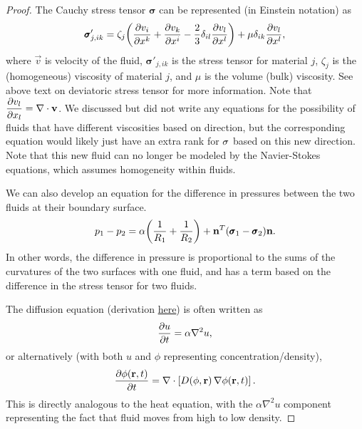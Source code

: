 \documentclass[12 pt]{article}
\theoremstyle{definition}
\begin{document}
\begin{proof}
The Cauchy stress tensor $\pmb{\sigma}$ can be represented (in Einstein notation) as
\[\pmb{\sigma}'_{j,ik} = \zeta_j\pqty{\pdv{v_i}{x^k}+\pdv{v_k}{x^i}-\frac{2}{3}\delta_{il}\pdv{v_l}{x^l}} + \mu\delta_{ik}\pdv{v_l}{x^l},\]
where $\vec{v}$ is velocity of the fluid, $\pmb{\sigma}'_{j,ik}$ is the stress tensor for material $j$, $\zeta_j$ is the (homogeneous) viscosity of material $j$, and $\mu$ is the volume (bulk) viscosity. See above text on deviatoric stress tensor for more information. Note that $\displaystyle\pdv{v_l}{x_l} = \nabla\cdot\vb{v}$. We discussed but did not write any equations for the possibility of fluids that have different viscosities based on direction, but the corresponding equation would likely just have an extra rank for $\vb{\sigma}$ based on this new direction. Note that this new fluid can no longer be modeled by the Navier-Stokes equations, which assumes homogeneity within fluids.

We can also develop an equation for the difference in pressures between the two fluids at their boundary surface.
\[p_1-p_2 = \alpha\pqty{\frac{1}{R_1} + \frac{1}{R_2}} + \vb{n}^T\pqty{\pmb{\sigma}_1 - \pmb{\sigma}_2}\vb{n}.\]
In other words, the difference in pressure is proportional to the sums of the curvatures of the two surfaces with one fluid, and has a term based on the difference in the stress tensor for two fluids.

The diffusion equation (derivation \href{https://ceprofs.civil.tamu.edu/ssocolofsky/cven489/Downloads/Book/Ch1.pdf}{here}) is often written as
\[\pdv{u}{t} = \alpha\nabla^2u,\]
or alternatively (with both $u$ and $\phi$ representing concentration/density),
\[\pdv{\phi(\vb{r},t)}{t} = \nabla\cdot\left[D(\phi,\vb{r})\,\nabla\phi(\vb{r},t)\right].\]
This is directly analogous to the heat equation, with the $\alpha\nabla^2u$ component representing the fact that fluid moves from high to low density.
\end{proof}
\end{document}

